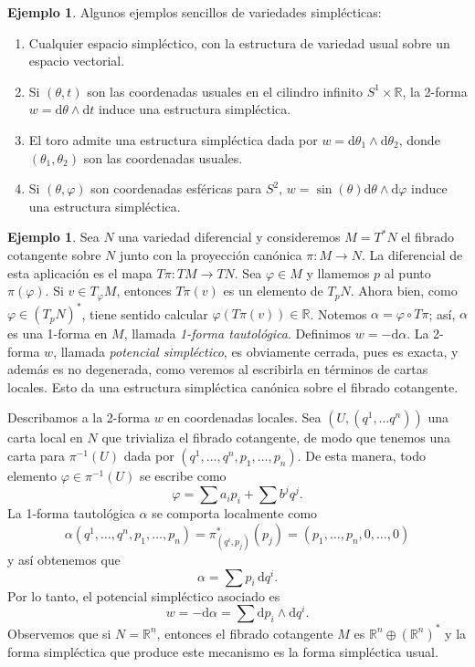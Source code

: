 \documentclass[11pt, a4paper]{article}
\newcommand{\RR}{\mathbb{R}}
\theoremstyle{plain}
\theoremstyle{definition}
\newtheorem{exmp}[prop]{Ejemplo}
\begin{document}
\begin{exmp} Algunos ejemplos sencillos de variedades simplécticas:
\begin{enumerate}
\item Cualquier espacio simpléctico, con la estructura de variedad usual sobre un espacio vectorial.
\item Si $(\theta, t)$ son las coordenadas usuales en el cilindro infinito $S^1\times \RR$, la 2-forma $w=\mathrm{d}\theta\wedge\mathrm{d}t$ induce una estructura simpléctica.
\item El toro admite una estructura simpléctica dada por $w=\mathrm{d}\theta_1\wedge\mathrm{d}\theta_2$, donde $(\theta_1,\theta_2)$ son las coordenadas usuales.
\item Si $(\theta,\varphi)$ son coordenadas esféricas para $S^2$, $w=\sin(\theta)\mathrm{d}\theta\wedge\mathrm{d}\varphi$ induce una estructura simpléctica.
\end{enumerate}
\end{exmp}
\begin{exmp} Sea $N$ una variedad diferencial y consideremos $M=T^*N$ el fibrado cotangente sobre $N$ junto con la proyección canónica $\pi:M\to N$. La diferencial de esta aplicación es el mapa $T\pi:TM\to TN$. Sea $\varphi\in M$ y llamemos $p$ al punto $\pi(\varphi)$. Si $v\in T_\varphi M$, entonces $T\pi(v)$ es un elemento de $T_pN$. Ahora bien, como $\varphi \in (T_pN)^*$, tiene sentido calcular $\varphi(T\pi(v))\in \RR$. Notemos $\alpha = \varphi\circ T\pi$; así, $\alpha$ es una 1-forma en $M$, llamada \emph{1-forma tautológica}. Definimos $w=-\mathrm{d}\alpha$. La 2-forma $w$, llamada \emph{potencial simpléctico}, es obviamente cerrada, pues es exacta, y además es no degenerada, como veremos al escribirla en términos de cartas locales. Esto da una estructura simpléctica canónica sobre el fibrado cotangente.

Describamos a la 2-forma $w$ en coordenadas locales. Sea $(U, (q^1,\dots q^n))$ una carta local en $N$ que trivializa el fibrado cotangente, de modo que tenemos una carta para $\pi^{-1}(U)$ dada por $(q^1,\dots,q^n,p_1,\dots,p_n)$. De esta manera, todo elemento $\varphi\in\pi^{-1}(U)$ se escribe como
\[\varphi = \sum a_i p_i + \sum b^jq^j.\]
La 1-forma tautológica $\alpha$ se comporta localmente como
\[\alpha(q^1,\dots,q^n,p_1,\dots,p_n)= \pi^*_{(q^i,p_j)}(p_j) =(p_1,\dots,p_n,0,\dots,0)\]
y así obtenemos que
\[\alpha=\sum p_i\,\mathrm{d}q^i.\]
Por lo tanto, el potencial simpléctico asociado es
\[w= -\mathrm{d}\alpha = \sum \mathrm{d}p_i\wedge \mathrm{d}q^i.\]
Observemos que si $N=\RR^n$, entonces el fibrado cotangente $M$ es $\RR^n\oplus (\RR^n)^*$ y la forma simpléctica que produce este mecanismo es la forma simpléctica usual.
\end{exmp}
\end{document}
